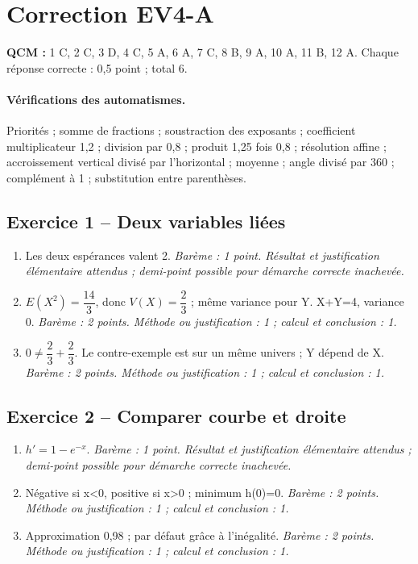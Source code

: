 \clearpage\section*{Correction EV4-A}\label{EV4-A-CORR}
\textbf{QCM :} 1 C, 2 C, 3 D, 4 C, 5 A, 6 A, 7 C, 8 B, 9 A, 10 A, 11 B, 12 A. Chaque réponse correcte : 0,5 point ; total 6.
\paragraph{Vérifications des automatismes.} Priorités ; somme de fractions ; soustraction des exposants ; coefficient multiplicateur 1,2 ; division par 0,8 ; produit 1,25 fois 0,8 ; résolution affine ; accroissement vertical divisé par l’horizontal ; moyenne ; angle divisé par 360 ; complément à 1 ; substitution entre parenthèses.
\subsection*{Exercice 1 -- Deux variables liées}
\begin{enumerate}
\item Les deux espérances valent 2. \textit{Barème : 1 point. Résultat et justification élémentaire attendus ; demi-point possible pour démarche correcte inachevée.}
\item $E(X^2)=\dfrac{14}{3}$, donc $V(X)=\dfrac{2}{3}$ ; même variance pour Y. X+Y=4, variance 0. \textit{Barème : 2 points. Méthode ou justification : 1 ; calcul et conclusion : 1.}
\item $0\ne \dfrac{2}{3}+\dfrac{2}{3}$. Le contre-exemple est sur un même univers ; Y dépend de X. \textit{Barème : 2 points. Méthode ou justification : 1 ; calcul et conclusion : 1.}
\end{enumerate}
\subsection*{Exercice 2 -- Comparer courbe et droite}
\begin{enumerate}
\item $h\prime=1-e^{-x}$. \textit{Barème : 1 point. Résultat et justification élémentaire attendus ; demi-point possible pour démarche correcte inachevée.}
\item Négative si x<0, positive si x>0 ; minimum h(0)=0. \textit{Barème : 2 points. Méthode ou justification : 1 ; calcul et conclusion : 1.}
\item Approximation 0,98 ; par défaut grâce à l’inégalité. \textit{Barème : 2 points. Méthode ou justification : 1 ; calcul et conclusion : 1.}
\end{enumerate}
